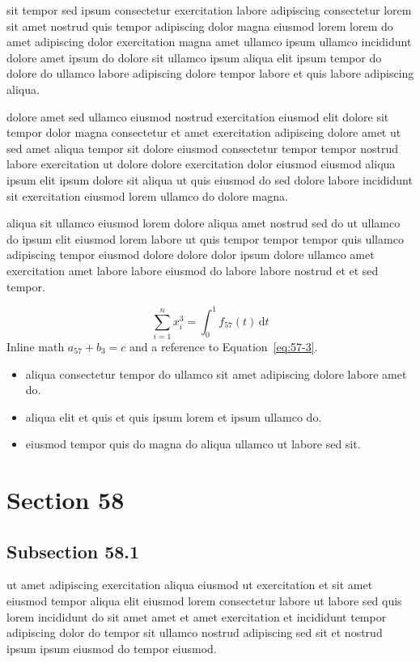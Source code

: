 \documentclass{article}
\begin{document}
sit tempor sed ipsum consectetur exercitation labore adipiscing consectetur lorem sit amet nostrud quis tempor adipiscing dolor magna eiusmod lorem lorem do amet adipiscing dolor exercitation magna amet ullamco ipsum ullamco incididunt dolore amet ipsum do dolore sit ullamco ipsum aliqua elit ipsum tempor do dolore do ullamco labore adipiscing dolore tempor labore et quis labore adipiscing aliqua.

dolore amet sed ullamco eiusmod nostrud exercitation eiusmod elit dolore sit tempor dolor magna consectetur et amet exercitation adipiscing dolore amet ut sed amet aliqua tempor sit dolore eiusmod consectetur tempor tempor nostrud labore exercitation ut dolore dolore exercitation dolor eiusmod eiusmod aliqua ipsum elit ipsum dolore sit aliqua ut quis eiusmod do sed dolore labore incididunt sit exercitation eiusmod lorem ullamco do dolore magna.

aliqua sit ullamco eiusmod lorem dolore aliqua amet nostrud sed do ut ullamco do ipsum elit eiusmod lorem labore ut quis tempor tempor tempor quis ullamco adipiscing tempor eiusmod dolore dolore dolor ipsum dolore ullamco amet exercitation amet labore labore eiusmod do labore labore nostrud et et sed tempor.

\begin{equation}\label{eq:57-3}
  \sum_{i=1}^{n} x_i^{3} = \int_0^1 f_{57}(t)\,\mathrm{d}t
\end{equation}
Inline math $a_{57} + b_{3} = c$ and a reference to Equation~\eqref{eq:57-3}.

\begin{itemize}
  \item aliqua consectetur tempor do ullamco sit amet adipiscing dolore labore amet do.
  \item aliqua elit et quis et quis ipsum lorem et ipsum ullamco do.
  \item eiusmod tempor quis do magna do aliqua ullamco ut labore sed sit.
\end{itemize}

\section{Section 58}\label{sec:58}
\subsection{Subsection 58.1}\label{sec:58-1}
ut amet adipiscing exercitation aliqua eiusmod ut exercitation et sit amet eiusmod tempor aliqua elit eiusmod lorem consectetur labore ut labore sed quis lorem incididunt do sit amet amet et amet exercitation et incididunt tempor adipiscing dolor do tempor sit ullamco nostrud adipiscing sed sit et nostrud ipsum ipsum eiusmod do tempor eiusmod.
\end{document}
